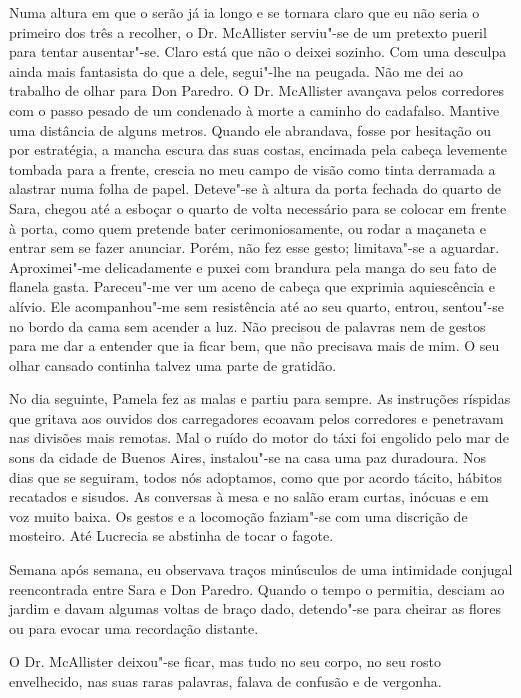 Numa altura em que o serão já ia longo e se tornara claro que eu não
seria o primeiro dos três a recolher, o Dr. McAllister serviu"-se de um
pretexto pueril para tentar ausentar"-se. Claro está que não o deixei
sozinho. Com uma desculpa ainda mais fantasista do que a dele, segui"-lhe
na peugada. Não me dei ao trabalho de olhar para Don Paredro. O Dr.
McAllister avançava pelos corredores com o passo pesado de um condenado à morte a caminho do cadafalso. Mantive uma distância de alguns
metros. Quando ele abrandava, fosse por hesitação ou por estratégia, a
mancha escura das suas costas, encimada pela cabeça levemente tombada
para a frente, crescia no meu campo de visão como tinta derramada a
alastrar numa folha de papel. Deteve"-se à altura da porta fechada do
quarto de Sara, chegou até a esboçar o quarto de volta necessário para
se colocar em frente à porta, como quem pretende bater cerimoniosamente, ou rodar a maçaneta e entrar sem se fazer anunciar. Porém,
não fez esse gesto; limitava"-se a aguardar. Aproximei"-me delicadamente
e puxei com brandura pela manga do seu fato de flanela gasta. Pareceu"-me
ver um aceno de cabeça que exprimia aquiescência e alívio. Ele
acompanhou"-me sem resistência até ao seu quarto, entrou, sentou"-se no
bordo da cama sem acender a luz. Não precisou de palavras nem de gestos para me dar a entender que ia ficar bem, que não precisava mais de
mim. O seu olhar cansado continha talvez uma parte de gratidão.

No dia seguinte, Pamela fez as malas e partiu para sempre. As
instruções ríspidas que gritava aos ouvidos dos carregadores ecoavam
pelos corredores e penetravam nas divisões mais remotas. Mal o ruído do
motor do táxi foi engolido pelo mar de sons da cidade de Buenos Aires,
instalou"-se na casa uma paz duradoura. Nos dias que se seguiram, todos
nós adoptamos, como que por acordo tácito, hábitos recatados e sisudos.
As conversas à mesa e no salão eram curtas, inócuas e em voz muito
baixa. Os gestos e a locomoção faziam"-se com uma discrição de mosteiro.
Até Lucrecia se abstinha de tocar o fagote.

Semana após semana, eu observava traços minúsculos de uma intimidade
conjugal reencontrada entre Sara e Don Paredro. Quando o tempo o
permitia, desciam ao jardim e davam algumas voltas de braço dado,
detendo"-se para cheirar as flores ou para evocar uma recordação
distante.

O Dr. McAllister deixou"-se ficar, mas tudo no seu corpo, no seu rosto
envelhecido, nas suas raras palavras, falava de confusão e de vergonha.

